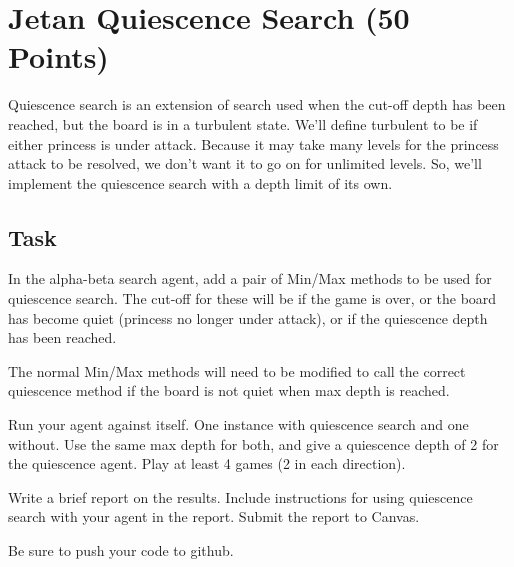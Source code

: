 \section*{Jetan Quiescence Search (50 Points)}

Quiescence search is an extension of search used
when the cut-off depth has been reached, but the board
is in a turbulent state.  We'll define turbulent to
be if either princess is under attack. Because it may
take many levels for the princess attack to be resolved,
we don't want it to go on for unlimited levels.  So, we'll
implement the quiescence search with a depth limit of
its own.
  
\subsection*{Task}

In the alpha-beta search agent, add a pair of Min/Max
methods to be used for quiescence search.  The cut-off
for these will be if the game is over, or the board
has become quiet (princess no longer under attack), or
if the quiescence depth has been reached.

The normal Min/Max methods will need to be modified to
call the correct quiescence method if the board is
not quiet when max depth is reached.

Run your agent against itself.  One instance with quiescence
search and one without.  Use the same max depth for both,
and give a quiescence depth of 2 for the quiescence agent.
Play at least 4 games (2 in each direction).

Write a brief report on the results.  Include instructions
for using quiescence search with your agent in the report.
Submit the report to Canvas.

Be sure to push your code to github.

